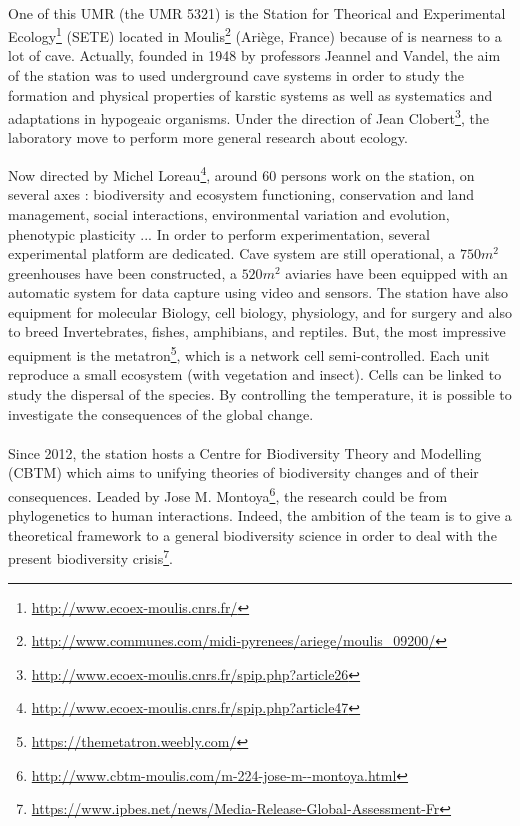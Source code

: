 \documentclass{article}
\begin{document}
\paragraph{}
One of this UMR (the UMR 5321) is  the Station for Theorical and Experimental Ecology\footnote{\url{http://www.ecoex-moulis.cnrs.fr/}} (SETE) located in Moulis\footnote{\url{http://www.communes.com/midi-pyrenees/ariege/moulis_09200/}} (Ariège, France) because of is nearness to a lot of cave. Actually, founded in 1948 by professors Jeannel and Vandel, the aim of the station was to used underground cave systems in order to study the formation and physical properties of karstic systems as well as systematics and adaptations in hypogeaic organisms. Under the direction of Jean Clobert\footnote{\url{http://www.ecoex-moulis.cnrs.fr/spip.php?article26}}, the laboratory move to perform more general research about ecology.

Now directed by Michel Loreau\footnote{\url{http://www.ecoex-moulis.cnrs.fr/spip.php?article47}}, around 60 persons work on the station, on several axes : biodiversity and ecosystem functioning, conservation and land management, social interactions, environmental variation and evolution, phenotypic plasticity ...
In order to perform experimentation, several experimental platform are dedicated. Cave system are still operational, a $750m^2$ greenhouses have been constructed, a $520m^2$ aviaries have been equipped with an automatic system for data capture using video and sensors. The station have also equipment for molecular Biology, cell biology, physiology, and for surgery and also to breed Invertebrates, fishes, amphibians, and reptiles. But, the most impressive equipment is the metatron\footnote{\url{https://themetatron.weebly.com/}}, which is a network cell semi-controlled. Each unit reproduce a small ecosystem (with vegetation and insect). Cells can be linked to study the dispersal of the species. By controlling the temperature, it is possible to investigate the consequences of the global change.



\paragraph{}
Since 2012, the station hosts a Centre for Biodiversity Theory and Modelling (CBTM)  which aims to unifying theories of biodiversity changes and of their consequences. Leaded by 
Jose M. Montoya\footnote{\url{http://www.cbtm-moulis.com/m-224-jose-m--montoya.html}}, the research could be from phylogenetics to human interactions. Indeed, the ambition of the team is to give a theoretical framework to a general biodiversity science in order to deal with the present biodiversity crisis\footnote{\url{https://www.ipbes.net/news/Media-Release-Global-Assessment-Fr}}.
\end{document}
